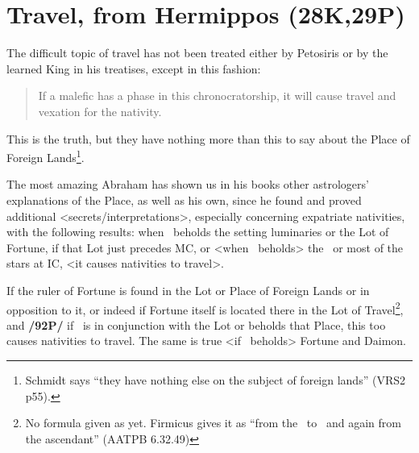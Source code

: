 \section{Travel, from Hermippos (28K,29P)}

The difficult topic of travel has not been treated either by Petosiris or by the learned King in his treatises, except in this fashion: \begin{quote}If a malefic has a phase in this chronocratorship, it will cause travel and vexation for the nativity.\end{quote} This is the truth, but they have nothing more than this to say about the Place of Foreign Lands\footnote{Schmidt says ``they have nothing else on the subject of foreign lands'' (VRS2 p55).}. 

The most amazing Abraham has shown us in his books other astrologers’ explanations of the Place, as well as his own, since he found and proved additional <secrets/interpretations>, especially concerning expatriate nativities, with the following results: when \Mars\, beholds the setting luminaries or the Lot of Fortune, if that Lot just precedes MC, or <when \Mars\, beholds> the \Moon\, or most of the stars at IC, <it causes nativities to travel>. 

If the ruler of Fortune is found in the Lot or Place of Foreign Lands or in opposition to it, or indeed if Fortune itself is located there in the Lot of Travel\footnote{No formula given as yet. Firmicus gives it as ``from the \Sun\, to \Mars\, and again from the ascendant'' (AATPB 6.32.49) }, and \textbf{/92P/} if \Mars\, is in conjunction with the Lot or beholds that Place, this too causes nativities to travel. The same is true <if \Mars\, beholds> Fortune and Daimon.


\newpage